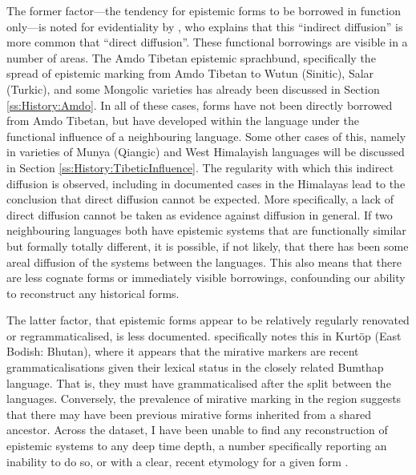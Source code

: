 The former factor---the tendency for epistemic forms to be borrowed in function only---is noted for evidentiality by , who explains that this ``indirect diffusion'' is more common that ``direct diffusion''. These functional borrowings are visible in a number of areas. The Amdo Tibetan epistemic sprachbund, specifically the spread of epistemic marking from Amdo Tibetan to Wutun (Sinitic), Salar (Turkic), and some Mongolic varieties has already been discussed in Section \ref{ss:History:Amdo}. In all of these cases, forms have not been directly borrowed from Amdo Tibetan, but have developed within the language under the functional influence of a neighbouring language. Some other cases of this, namely in varieties of Munya (Qiangic) and West Himalayish languages will be discussed in Section \ref{ss:History:TibeticInfluence}. The regularity with which this indirect diffusion is observed, including in documented cases in the Himalayas lead to the conclusion that direct diffusion cannot be expected. More specifically, a lack of direct diffusion cannot be taken as evidence against diffusion in general. If two neighbouring languages both have epistemic systems that are functionally similar but formally totally different, it is possible, if not likely, that there has been some areal diffusion of the systems between the languages. This also means that there are less cognate forms or immediately visible borrowings, confounding our ability to reconstruct any historical forms.

The latter factor, that epistemic forms appear to be relatively regularly renovated or regrammaticalised, is less documented.  specifically notes this in Kurtöp (East Bodish: Bhutan), where it appears that the mirative markers are recent grammaticalisations given their lexical status in the closely related Bumthap language. That is, they must have grammaticalised after the split between the languages. Conversely, the prevalence of mirative marking in the region suggests that there may have been previous mirative forms inherited from a shared ancestor. Across the dataset, I have been unable to find any reconstruction of epistemic systems to any deep time depth, a number specifically reporting an inability to do so, or with a clear, recent etymology for a given form \cites{Thurgood1986}{}.

